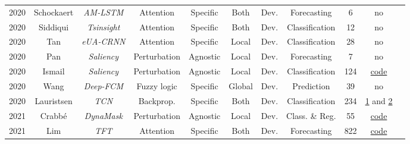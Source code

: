 \begin{table*}[h!]
\begin{tabular}{@{}ccccccccccc@{}}
    2020        & Schockaert\cite{schockaert_attention_2020} & \textit{\footnotesize{AM-LSTM}}& Attention&Specific       & Both          & Dev.      & Forecasting                       & 6                 & no\\ 

    2020        & Siddiqui\cite{siddiqui_tsinsight_2020}& \textit{Tsinsight}& Attention   &Specific       &Both           & Dev.      & Classification                    & 12                & no \\ 

    2020        & Tan\cite{tan_explainable_2021}                 &\textit{\footnotesize{eUA-CRNN}}  & Attention     &Specific       & Local         & Dev.      & Classification                                & 28                & no\\  

    2020        & Pan\cite{pan_series_2020}           &\textit{Saliency}& Perturbation    &Agnostic       & Local         & Dev.      & Forecasting                       & 7                 & no \\ 

    2020        & Ismail\cite{ismail_benchmarking_2020}           &\textit{Saliency}& Perturbation    &Agnostic       & Local         & Dev.      & Classification                    & 124               & \href{https://github.com/ayaabdelsalam91/TS-Interpretability-Benchmark}{code}\\ 

    2020        & Wang\cite{wang_deep_2021}           & \textit{\footnotesize{Deep-FCM}}& Fuzzy logic    &Specific       & Global        & Dev.      & Prediction                        & 39                & no\\ 

    2020        & Lauristsen\cite{lauritsen_early_2020}   &\textit{TCN}       &Backprop.      &Specific       & Both          & Dev.      & Classification                    & 234               & \href{https://github.com/albermax/innvestigate}{1} and \href{https://github.com/slundberg/shap}{2} \\

    2021        &Crabbé\cite{crabbe_explaining_2021}    & \textit{DynaMask}     & Perturbation  & Agnostic      & Local     & Dev.      & Class. \& Reg.                    & 55            & \href{https://github.com/JonathanCrabbe/Dynamask}{code}   \\ 

    2021        & Lim\cite{lim_temporal_2020}         & \textit{TFT}      & Attention     &Specific       & Both          & Dev.      & Forecasting                       & 822               & \href{https://github.com/greatwhiz/tft_tf2}{code}       \\ 


\end{tabular}
\end{table*}
